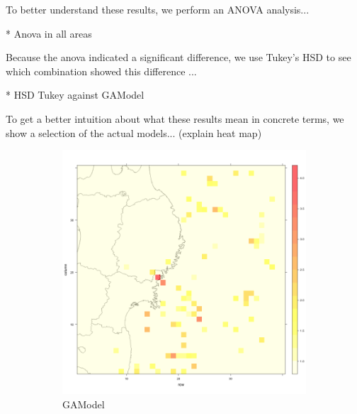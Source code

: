
To better understand these results, we perform an ANOVA analysis...

* Anova in all areas

Because the anova indicated a significant difference, we use Tukey's
HSD to see which combination showed this difference ...

* HSD Tukey against GAModel


To get a better intuition about what these results mean in concrete
terms, we show a selection of the actual models... (explain heat map)

\begin{figure}
\centering
\begin{subfigure}{.5\textwidth}
  \centering
  \includegraphics[width=1\linewidth]{img/gaModel}
  \caption{GAModel}
  \label{fig:sub1}
\end{subfigure}%
\begin{subfigure}{.5\textwidth}
  \centering

\end{subfigure}
\end{figure}
